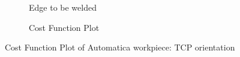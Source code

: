 \begin{figure}[!htbp] %
	\centering
	\begin{subfigure}[b]{0.4\textwidth}
		\caption{Edge to be welded}  
		\label{fig:cp4b}
	\end{subfigure}
	\begin{subfigure}[b]{0.4\textwidth}
		\caption{Cost Function Plot}  
		\label{fig:cp4a}
	\end{subfigure}	
	\caption{Cost Function Plot of Automatica workpiece: TCP orientation}
	\label{fig:cp4}
\end{figure}

